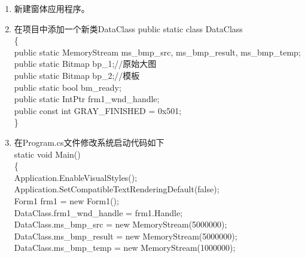 ﻿\documentclass[12pt,a4paper,oneside]{book}
\begin{document}
\begin{enumerate}
\item 新建窗体应用程序。
\item 在项目中添加一个新类DataClass
\hspace*{0em}public static class DataClass\\
\hspace*{2em}\{\\
\hspace*{4em}public static MemoryStream ms\_bmp\_src, ms\_bmp\_result, ms\_bmp\_temp;\\
\hspace*{4em}public static Bitmap bp\_1;//原始大图\\
\hspace*{4em}public static Bitmap bp\_2;//模板\\
\hspace*{4em}public static bool bm\_ready; \\
\hspace*{4em}public static IntPtr frm1\_wnd\_handle;\\
\hspace*{4em}public const int GRAY\_FINISHED = 0x501;\\
\hspace*{2em}\}\\
\item 在Program.cs文件修改系统启动代码如下\\
\hspace*{4em}		static void Main()\\
\hspace*{4em}\{\\
\hspace*{6em}Application.EnableVisualStyles();\\
\hspace*{6em}Application.SetCompatibleTextRenderingDefault(false);\\
\hspace*{6em}Form1 frm1 = new Form1();\\
\hspace*{6em}DataClass.frm1\_wnd\_handle = frm1.Handle;\\
\hspace*{6em}DataClass.ms\_bmp\_src = new MemoryStream(5000000);\\
\hspace*{6em}DataClass.ms\_bmp\_result = new MemoryStream(5000000);\\
\hspace*{6em}DataClass.ms\_bmp\_temp = new MemoryStream(1000000); \\

\end{enumerate}
\end{document}
